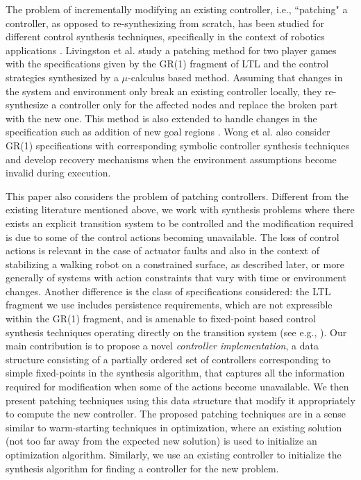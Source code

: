 The problem of incrementally modifying an existing controller, i.e., ``patching" a controller, as opposed to re-synthesizing from scratch, has been studied for different control synthesis techniques, specifically in the context of robotics applications \cite{Livingston,Livingston2014,wong2014correct}. Livingston et al. \cite{Livingston} study a patching method for two player games with the specifications given by the GR(1) fragment of LTL and the control strategies synthesized by a $ \mu $-calculus based method. Assuming that changes in the system and environment only break an existing controller locally, they re-synthesize a controller only for the affected nodes and replace the broken part with the new one. %
This method is also extended to handle changes in the specification such as addition of new goal regions \cite{Livingston2014}. Wong et al. \cite{wong2014correct} also consider GR(1) specifications with corresponding symbolic controller synthesis techniques and develop recovery mechanisms when the environment assumptions become invalid during execution. 

This paper also considers the problem of patching controllers. Different from the existing literature mentioned above, we work with synthesis problems where there exists an explicit transition system to be controlled and the modification required is due to some of the control actions becoming unavailable. The loss of control actions is relevant in the case of actuator faults and also in the context of stabilizing a walking robot on a constrained surface, as described later, 
or more generally of systems with action constraints that vary with time or environment changes. Another difference is the class of specifications considered: the LTL fragment we use includes persistence requirements, which are not expressible within the GR(1) fragment, and is amenable to fixed-point based control synthesis techniques operating directly on the transition system (see e.g., \cite{wolff2013efficient,Nilsson2017}). Our main contribution is to propose a novel \emph{controller implementation}, a data structure consisting of a partially ordered set of controllers corresponding to simple fixed-points in the synthesis algorithm,  that captures all the information required for modification when some of the actions become unavailable. We then present patching techniques using this data structure that modify it appropriately to compute the new controller. The proposed patching techniques are in a sense similar to warm-starting techniques in optimization, where an existing solution (not too far away from the expected new solution) is used to initialize an optimization algorithm. Similarly, we use an existing controller to initialize the synthesis algorithm for finding a controller for the new problem. 


